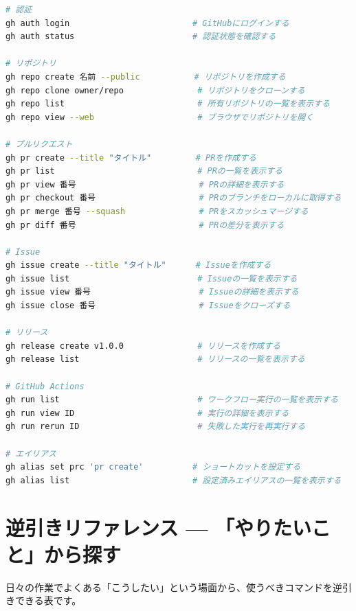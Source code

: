 \begin{lstlisting}[language=bash]
# 認証
gh auth login                         # GitHubにログインする
gh auth status                        # 認証状態を確認する

# リポジトリ
gh repo create 名前 --public           # リポジトリを作成する
gh repo clone owner/repo               # リポジトリをクローンする
gh repo list                           # 所有リポジトリの一覧を表示する
gh repo view --web                     # ブラウザでリポジトリを開く

# プルリクエスト
gh pr create --title "タイトル"         # PRを作成する
gh pr list                             # PRの一覧を表示する
gh pr view 番号                         # PRの詳細を表示する
gh pr checkout 番号                     # PRのブランチをローカルに取得する
gh pr merge 番号 --squash               # PRをスカッシュマージする
gh pr diff 番号                         # PRの差分を表示する

# Issue
gh issue create --title "タイトル"      # Issueを作成する
gh issue list                          # Issueの一覧を表示する
gh issue view 番号                      # Issueの詳細を表示する
gh issue close 番号                     # Issueをクローズする

# リリース
gh release create v1.0.0               # リリースを作成する
gh release list                        # リリースの一覧を表示する

# GitHub Actions
gh run list                            # ワークフロー実行の一覧を表示する
gh run view ID                         # 実行の詳細を表示する
gh run rerun ID                        # 失敗した実行を再実行する

# エイリアス
gh alias set prc 'pr create'          # ショートカットを設定する
gh alias list                         # 設定済みエイリアスの一覧を表示する
\end{lstlisting}

\section{逆引きリファレンス --- 「やりたいこと」から探す}

日々の作業でよくある「こうしたい」という場面から、使うべきコマンドを逆引きできる表です。

